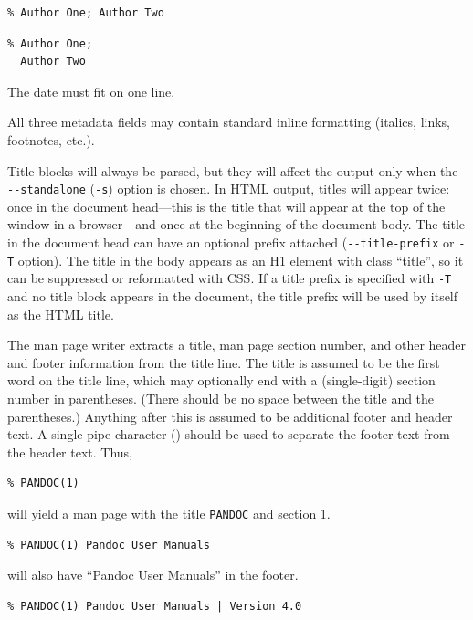 \documentclass[
  b5paper
]{book}
\begin{document}
\begin{verbatim}
% Author One; Author Two
\end{verbatim}

\begin{verbatim}
% Author One;
  Author Two
\end{verbatim}

The date must fit on one line.

All three metadata fields may contain standard inline formatting
(italics, links, footnotes, etc.).

Title blocks will always be parsed, but they will affect the output only
when the \texttt{-\/-standalone} (\texttt{-s}) option is chosen. In HTML
output, titles will appear twice: once in the document head---this is
the title that will appear at the top of the window in a browser---and
once at the beginning of the document body. The title in the document
head can have an optional prefix attached (\texttt{-\/-title-prefix} or
\texttt{-T} option). The title in the body appears as an H1 element with
class ``title'', so it can be suppressed or reformatted with CSS. If a
title prefix is specified with \texttt{-T} and no title block appears in
the document, the title prefix will be used by itself as the HTML title.

The man page writer extracts a title, man page section number, and other
header and footer information from the title line. The title is assumed
to be the first word on the title line, which may optionally end with a
(single-digit) section number in parentheses. (There should be no space
between the title and the parentheses.) Anything after this is assumed
to be additional footer and header text. A single pipe character
(\texttt{\textbar{}}) should be used to separate the footer text from
the header text. Thus,

\begin{verbatim}
% PANDOC(1)
\end{verbatim}

will yield a man page with the title \texttt{PANDOC} and section 1.

\begin{verbatim}
% PANDOC(1) Pandoc User Manuals
\end{verbatim}

will also have ``Pandoc User Manuals'' in the footer.

\begin{verbatim}
% PANDOC(1) Pandoc User Manuals | Version 4.0
\end{verbatim}
\end{document}
